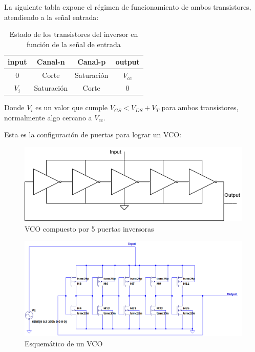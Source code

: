 \documentclass[12pt]{report} %
\begin{document}
	La siguiente tabla expone el régimen de funcionamiento de ambos transistores, atendiendo a la señal entrada:
	
	\begin{table}[H]\caption{Estado de los transistores del inversor en función de la señal de entrada}\label{tb:inverter-trans-state}
		\begin{tabular}{|c|c|c|c|}
			\hline
			input & Canal-n & Canal-p & output\\
			\hline
			0 & Corte & Saturación & $V_{cc}$ \\
			\hline
			$V_{i}$ & Saturación & Corte & 0 \\
			\hline
		\end{tabular}
	\end{table}
	
	Donde $V_i$ es un valor que cumple $V_{GS} < V_{DS} + V_{T}$ para ambos transistores, normalmente algo cercano a $V_{cc}$.
	
	Esta es la configuración de puertas para lograr un VCO:
	
	\begin{figure}[H]
		\includegraphics[width=\textwidth]{vco-symbol.png}
		\caption[VCO compuesto por 5 puertas inversoras]{VCO compuesto por 5 puertas inversoras}
		\label{fig:vco-symbol.png}
	\end{figure}
	
	\begin{figure}[H]
		\includegraphics[width=\textwidth]{vco-sch.png}
		\caption[Esquemático de un VCO]{Esquemático de un VCO}
		\label{fig:vco-sch.png}
	\end{figure}
	
\end{document}
